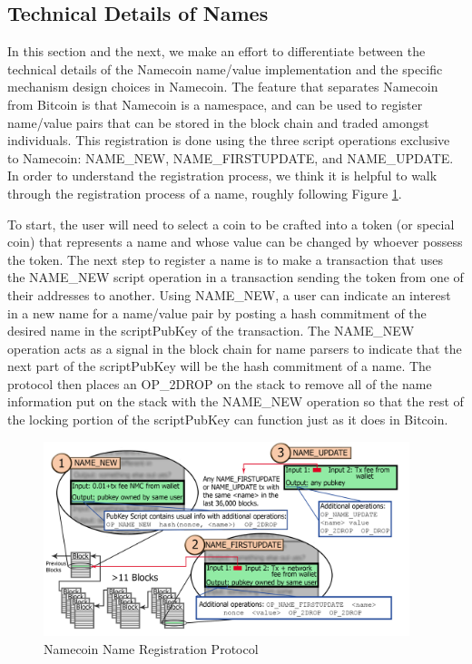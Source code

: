 \subsection{Technical Details of Names}

In this section and the next, we make an effort to differentiate between the technical details of the Namecoin name/value implementation and the specific mechanism design choices in Namecoin. The feature that separates Namecoin from Bitcoin is that Namecoin is a namespace, and can be used to register name/value pairs that can be stored in the block chain and traded amongst individuals. This registration is done using the three script operations exclusive to Namecoin: NAME\_NEW, NAME\_FIRSTUPDATE, and NAME\_UPDATE. In order to understand the registration process, we think it is helpful to walk through the registration process of a name, roughly following Figure \ref{fig:registration}. 

To start, the user will need to select a coin to be crafted into a token (or special coin) that represents a name and whose value can be changed by whoever possess the token. The next step to register a name is to make a transaction that uses the NAME\_NEW script operation in a transaction sending the token from one of their addresses to another. Using NAME\_NEW, a user can indicate an interest in a new name for a name/value pair by posting a hash commitment of the desired name in the scriptPubKey of the transaction. The NAME\_NEW operation acts as a signal in the block chain for name parsers to indicate that the next part of the scriptPubKey will be the hash commitment of a name. The protocol then places an OP\_2DROP on the stack to remove all of the name information put on the stack with the NAME\_NEW operation so that the rest of the locking portion of the scriptPubKey can function just as it does in Bitcoin. 

\begin{figure}
  \centering
  \includegraphics[width=0.95\textwidth]{registration.png}
  \caption{Namecoin Name Registration Protocol}
  \label{fig:registration}
\end{figure}

